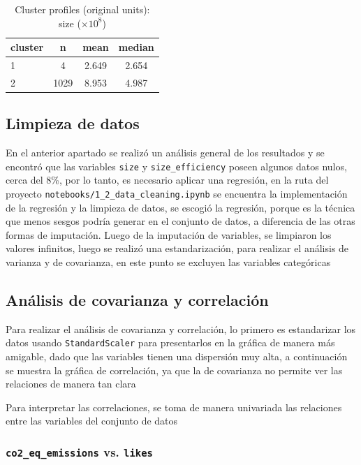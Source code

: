 \documentclass[journal]{IEEEtran}
\begin{document}
\begin{table}[t]
	\centering
	\small
	\caption{Cluster profiles (original units): size ($\times 10^{8}$)}
	\label{tab:profile-c}
	\renewcommand{\arraystretch}{1.1}
	\begin{tabular}{l S[table-format=4.0] S[table-format=1.3] S[table-format=1.3]}
		\toprule
		\textbf{cluster} & \textbf{n} & \textbf{mean} & \textbf{median} \\
		 & 4    & 2.649 & 2.654 \\
		2 & 1029 & 8.953 & 4.987 \\
		\bottomrule
	\end{tabular}
\end{table}

	\subsection{Limpieza de datos}
	En el anterior apartado se realizó un análisis general de los resultados y se encontró que las variables \texttt{size} y \texttt{size\_efficiency} poseen algunos datos nulos, cerca del 8\%, por lo tanto, es necesario aplicar una regresión, en la ruta del proyecto \texttt{notebooks/1\_2\_data\_cleaning.ipynb} se encuentra la implementación de la regresión y la limpieza de datos, se escogió la regresión, porque es la técnica que menos sesgos podría generar en el conjunto de datos, a diferencia de las otras formas de imputación.
	Luego de la imputación de variables, se limpiaron los valores infinitos, luego se realizó una estandarización, para realizar el análisis de varianza y de covarianza, en este punto se excluyen las variables categóricas

	\subsection{Análisis de covarianza y correlación}
	Para realizar el análisis de covarianza y correlación, lo primero es estandarizar los datos usando \texttt{StandardScaler} para presentarlos en la gráfica de manera más amigable, dado que las variables tienen una dispersión muy alta, a continuación se muestra la gráfica de correlación, ya que la de covarianza no permite ver las relaciones de manera tan clara


	Para interpretar las correlaciones, se toma de manera univariada las relaciones entre las variables del conjunto de datos
	\subsubsection{\texttt{co2\_eq\_emissions} vs. \texttt{likes}}
\end{document}
